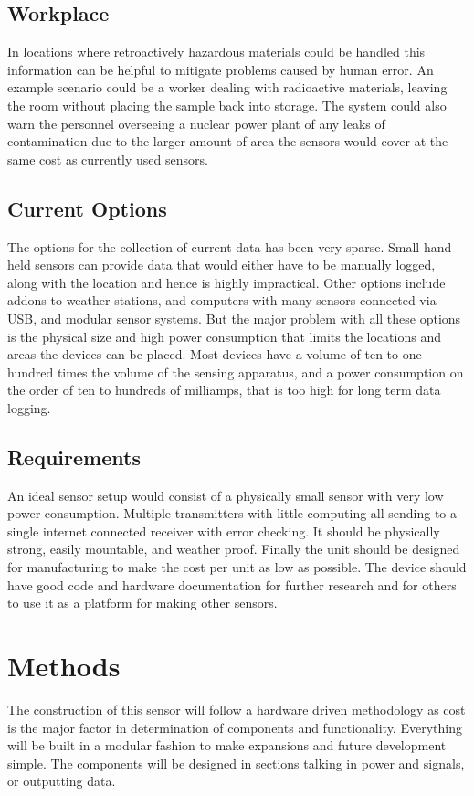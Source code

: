 \documentclass[10pt]{article}
\begin{document}
\subsection{Workplace}
In locations where retroactively hazardous materials could be handled this information can
be helpful to mitigate problems caused by human error. An example scenario could be a worker 
dealing with radioactive materials, leaving the room without placing the sample back into storage.
The system could also warn the personnel overseeing a nuclear power plant of any leaks of contamination
due to the larger amount of area the sensors would cover at the same cost as currently used sensors.

\subsection{Current Options}
The options for the collection of current data has been very sparse. Small hand held sensors can
provide data that would either have to be manually logged, along with the location and hence is 
highly impractical. Other options include addons to weather stations, and computers with many 
sensors connected via USB, and modular sensor systems. But the major problem with 
all these options is the physical size and high power consumption that limits the locations and 
areas the devices can be placed. Most devices have a volume of ten to one hundred times the 
volume of the sensing apparatus, and a power consumption on the order of ten to hundreds of 
milliamps, that is too high for long term data logging.

\subsection{Requirements}
An ideal sensor setup would consist of a physically small sensor with very low power consumption. 
Multiple transmitters with little computing all sending to a single internet connected receiver 
with error checking. It should be physically strong, easily mountable, and weather proof. Finally
the unit should be designed for manufacturing to make the cost per unit as low as possible. The 
device should have good code and hardware documentation for further research and for others to use 
it as a platform for making other sensors.


\section{Methods}
The construction of this sensor will follow a hardware driven methodology
as cost is the major factor in determination of components and functionality.
Everything will be built in a modular fashion to make expansions and future
development simple. The components will be designed in sections talking in power
and signals, or outputting data. 
\end{document}

